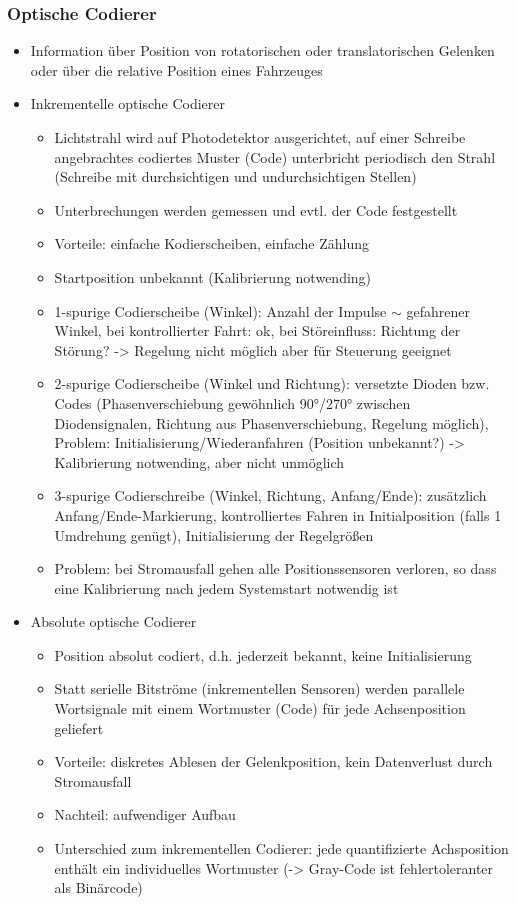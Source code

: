 \documentclass[paper=a4, fontsize=11pt]{scrartcl} %
\numberwithin{equation}{section} %
\numberwithin{figure}{section} %
\numberwithin{table}{section} %
\begin{document}
\subsubsection{Optische Codierer}

\begin{itemize}
\item Information über Position von rotatorischen oder translatorischen Gelenken oder über die relative Position eines Fahrzeuges
\item Inkrementelle optische Codierer
\begin{itemize}
\item Lichtstrahl wird auf Photodetektor ausgerichtet, auf einer Schreibe angebrachtes codiertes Muster (Code) unterbricht periodisch den Strahl (Schreibe mit durchsichtigen und undurchsichtigen Stellen)
\item Unterbrechungen werden gemessen und evtl. der Code festgestellt
\item Vorteile: einfache Kodierscheiben, einfache Zählung
\item Startposition unbekannt (Kalibrierung notwending)
\item 1-spurige Codierscheibe (Winkel): Anzahl der Impulse $\sim$ gefahrener Winkel, bei kontrollierter Fahrt: ok, bei Störeinfluss: Richtung der Störung? -> Regelung nicht möglich aber für Steuerung geeignet
\item 2-spurige Codierscheibe (Winkel und Richtung): versetzte Dioden bzw. Codes (Phasenverschiebung gewöhnlich 90°/270° zwischen Diodensignalen, Richtung aus Phasenverschiebung, Regelung möglich), Problem: Initialisierung/Wiederanfahren (Position unbekannt?) -> Kalibrierung notwending, aber nicht unmöglich
\item 3-spurige Codierschreibe (Winkel, Richtung, Anfang/Ende): zusätzlich Anfang/Ende-Markierung, kontrolliertes Fahren in Initialposition (falls 1 Umdrehung genügt), Initialisierung der Regelgrößen
\item Problem: bei Stromausfall gehen alle Positionssensoren verloren, so dass eine Kalibrierung nach jedem Systemstart notwendig ist
\end{itemize}
\item Absolute optische Codierer
\begin{itemize}
\item Position absolut codiert, d.h. jederzeit bekannt, keine Initialisierung
\item Statt serielle Bitströme (inkrementellen Sensoren) werden parallele Wortsignale mit einem Wortmuster (Code) für jede Achsenposition geliefert
\item Vorteile: diskretes Ablesen der Gelenkposition, kein Datenverlust durch Stromausfall
\item Nachteil: aufwendiger Aufbau
\item Unterschied zum inkrementellen Codierer: jede quantifizierte Achsposition enthält ein individuelles Wortmuster (-> Gray-Code ist fehlertoleranter als Binärcode)
\end{itemize}
\end{itemize}
\end{document}
